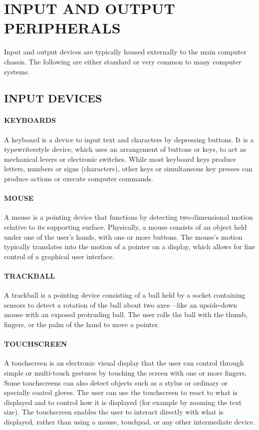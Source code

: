 \documentclass{article}
\begin{document}
\section{INPUT AND OUTPUT PERIPHERALS}
Input and output devices are typically housed externally to the main computer chassis. The following are either
standard or very common to many computer systems.
\subsection{INPUT DEVICES}
\paragraph{ KEYBOARDS}
 A keyboard is a device to input text and characters by depressing buttons. It is a typewriterstyle
device, which uses an arrangement of buttons or keys, to act as mechanical levers or electronic
switches. While most keyboard keys produce letters, numbers or signs (characters), other keys or
simultaneous key presses can produce actions or execute computer commands.
\paragraph{ MOUSE}
 A mouse is a pointing device that functions by detecting two-dimensional motion relative to its
supporting surface. Physically, a mouse consists of an object held under one of the user's hands, with
one or more buttons. The mouse's motion typically translates into the motion of a pointer on a display,
which allows for fine control of a graphical user interface. 
\paragraph{TRACKBALL}
 A trackball is a pointing device consisting of a ball held by a socket containing sensors to
detect a rotation of the ball about two axes—like an upside-down mouse with an exposed protruding
ball. The user rolls the ball with the thumb, fingers, or the palm of the hand to move a pointer.
\paragraph {TOUCHSCREEN}
 A touchscreen is an electronic visual display that the user can control through simple
or multi-touch gestures by touching the screen with one or more fingers. Some touchscreens can also
detect objects such as a stylus or ordinary or specially coated gloves. The user can use the touchscreen
to react to what is displayed and to control how it is displayed (for example by zooming the text size).
The touchscreen enables the user to interact directly with what is displayed, rather than using
a mouse, touchpad, or any other intermediate device. 
\end{document}
